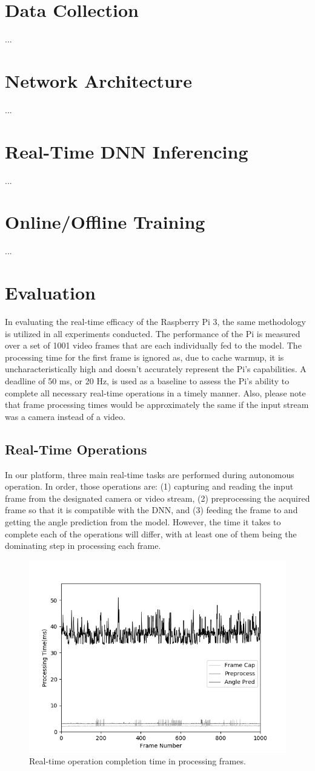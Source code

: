 \documentclass[10pt, conference]{IEEEtran}
\begin{document}
\section{Data Collection}
...
\section{Network Architecture}
...
\section{Real-Time DNN Inferencing}
...
\section{Online/Offline Training}
...
\section{Evaluation}
In evaluating the real-time efficacy of the Raspberry Pi 3, the same methodology is utilized in all 
experiments conducted. The performance of the Pi is measured over a set of 1001 video frames that are 
each individually fed to the model. The processing time for the first frame is ignored as, due to 
cache warmup, it is uncharacteristically high and doesn't accurately represent the Pi's capabilities. A 
deadline of 50 ms, or 20 Hz, is used as a baseline to assess the Pi's ability to complete all 
necessary real-time operations in a timely manner. Also, please note that frame processing times 
would be approximately the same if the input stream was a 
camera instead of a video. 

\subsection{Real-Time Operations}
In our platform, three main real-time tasks are performed during autonomous operation. 
In order, those operations are: (1) capturing and reading the input frame from the designated camera 
or video stream, (2) preprocessing the acquired frame so that it is compatible with the DNN, and (3) 
feeding the frame to and getting the angle prediction from the model. However, the time it takes to 
complete each of the operations will differ, with at least one of them being the dominating step in 
processing each frame.

\begin{figure}[h]
  \centering
  \includegraphics[width=.5\textwidth]{Operation_Time}
  \caption{ Real-time operation completion time in processing frames.}
\end{figure}
\end{document}
